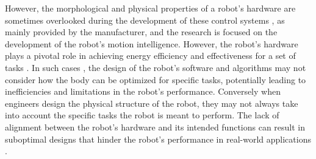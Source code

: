  However, the morphological and physical properties of a robot's hardware are sometimes overlooked   during the development of these control systems , as mainly provided by the manufacturer, and the research is focused on the development of the robot's motion intelligence. However, the robot's hardware plays a pivotal role in achieving energy efficiency and effectiveness for a set of tasks .
In such cases , the design of the robot's software and algorithms may not consider how the body can be optimized for specific tasks, potentially leading to inefficiencies and limitations in the robot's performance.  Conversely when engineers  design the physical structure of the robot, they may not always take into account the specific tasks the robot is meant to perform. The lack of alignment between the robot's hardware and its intended functions can result in suboptimal designs that hinder the robot's performance in real-world applications \citep{vaisi_review_2022, sartore_optimization_2022} .

